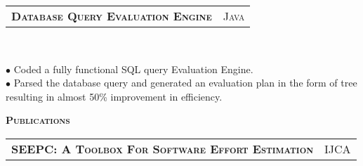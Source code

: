 \documentclass[10pt,a4paper,oneside]{article}
\begin{document}
    \begin{tabular}{c|c}
        \textbf{\normalsize D\textsc{atabase} Q\textsc{uery}
        E\textsc{valuation} E\textsc{ngine}}
        &\textmd{\normalsize J\textsc{ava}}
    \end{tabular}\\
     \vspace{-4mm}
    \begin{adjustwidth}{7pt}{0pt}
        {\footnotesize $\bullet$ Coded a fully functional SQL query Evaluation Engine.\\
        $\bullet$ Parsed the database query and generated an evaluation plan in the form of tree resulting in almost 50\% improvement in efficiency.}\\
    \end{adjustwidth}
    \begin{comment}
        \vspace{-6pt}
        \begin{tabular}{c|c}
            \textbf{\normalsize S\textsc{impella}}
            &\textmd{\normalsize J\textsc{ava}}
        \end{tabular}\\
         \vspace{-4mm}
        \begin{adjustwidth}{7pt}{0pt}
            {\footnotesize $\bullet$ Implemented a simplified version of the
            Gnutella Protocol Version 0.6, A chatting and file transfer
            system.\\
            $\bullet$ Analyzed important networking concepts like routing tables, table lookup, controlled
            flooding, protocol, packet formatting and distributive
            collaboration.\\
            $\bullet$ Included multitasking capabilities like simultaneous
            downloads and monitoring.}\\
        \end{adjustwidth}
    \end{comment}
    \vspace{-6pt}
    \textcolor{light-gray}{\textbf{\large P\textsc{ublications}}}
    \vspace{4pt}\\
    \begin{tabular}{c|c}
        \textbf{\normalsize SEEPC: A T\textsc{oolbox}
        F\textsc{or} S\textsc{oftware} E\textsc{ffort}
    E\textsc{stimation}}
        &\textmd{\normalsize IJCA}
    \end{tabular}
\end{document}

